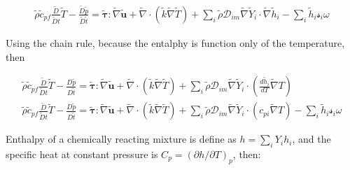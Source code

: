 \documentclass[preprint,12pt,authoryear]{elsarticle}
\begin{document}
\begin{equation}
\begin{split}
        \tilde{\rho}
        \tilde{c}_{pf}
        \frac{\tilde{D}}{\tilde{D} t}
        \tilde{T}
        -
        \frac{\tilde{D} \tilde{p}}{\tilde{D}\tilde{t}}
        =
        \pmb{\tilde{\tau}}:\tilde{\nabla} \tilde{\mathbf{u}} 
        + 
        \tilde{\nabla} \cdot (\tilde{k}\tilde{\nabla} \tilde{T})
        +
        \sum\limits_i 
        \tilde{\rho}
        \mathcal{D}_{im}
        \tilde{\nabla}
        \tilde{Y}_i     
        \cdot
        \tilde{\nabla} 
        \tilde{h}_i
	-
        \sum\limits_i
        \tilde{h}_i
        \mathcal{s}_i	
        \omega
\end{split}
\end{equation}

Using the chain rule, because the entalphy is function only of the temperature, then 

\begin{equation}
\begin{split}
        \tilde{\rho}
        \tilde{c}_{pf}
        \frac{\tilde{D}}{\tilde{D} t}
        \tilde{T}
        -
        \frac{D \tilde{p}}{D\tilde{t}}
        =
        \pmb{\tilde{\tau}}:\tilde{\nabla} \tilde{\mathbf{u}} 
        + 
        \tilde{\nabla} \cdot (\tilde{k}\tilde{\nabla} \tilde{T})
        +
        \sum\limits_i 
        \tilde{\rho}
        \mathcal{D}_{im}
        \tilde{\nabla}
        \tilde{Y}_i     
        \cdot
        \left(
        \frac{d \tilde{h}_i}{ d T}
        \tilde{\nabla}T 
        \right)
\\
        \tilde{\rho}
        \tilde{c}_{pf}
        \frac{\tilde{D}}{\tilde{D} t}
        \tilde{T}
        -
        \frac{D \tilde{p}}{D\tilde{t}}
        =
        \pmb{\tilde{\tau}}:\tilde{\nabla} \tilde{\mathbf{u}} 
        + 
        \tilde{\nabla} \cdot (\tilde{k}\tilde{\nabla} \tilde{T})
        +
        \sum\limits_i 
        \tilde{\rho}
        \mathcal{D}_{im}
        \tilde{\nabla}
        \tilde{Y}_i     
        \cdot
        \left(
        c_{pi}
        \tilde{\nabla}T 
        \right)
	-
        \sum\limits_i
        \tilde{h}_i
        \mathcal{s}_i	
         \omega
\end{split}
\end{equation}

Enthalpy of a chemically reacting mixture  
is define as $h=\sum_iY_ih_i$, and 
the specific heat  at constant pressure is 
$C_p=\left(\partial{h}/\partial{T}\right)_p$,
then:
\end{document}
